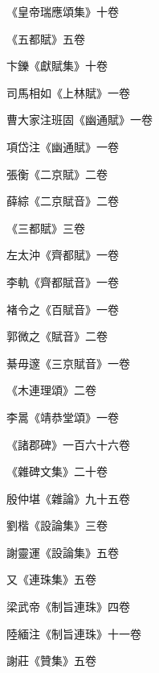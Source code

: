 \begin{pinyinscope}
 《皇帝瑞應頌集》十卷



 《五都賦》五卷



 卞鑠《獻賦集》十卷



 司馬相如《上林賦》一卷



 曹大家注班固《幽通賦》一卷



 項岱注《幽通賦》一卷



 張衡《二京賦》二卷



 薛綜《二京賦音》二卷



 《三都賦》三卷



 左太沖《齊都賦》一卷



 李軌《齊都賦音》一卷



 褚令之《百賦音》一卷



 郭微之《賦音》二卷



 綦毋邃《三京賦音》一卷



 《木連理頌》二卷



 李暠《靖恭堂頌》一卷



 《諸郡碑》一百六十六卷



 《雜碑文集》二十卷



 殷仲堪《雜論》九十五卷



 劉楷《設論集》三卷



 謝靈運《設論集》五卷



 又《連珠集》五卷



 梁武帝《制旨連珠》四卷



 陸緬注《制旨連珠》十一卷



 謝莊《贊集》五卷




\end{pinyinscope}
